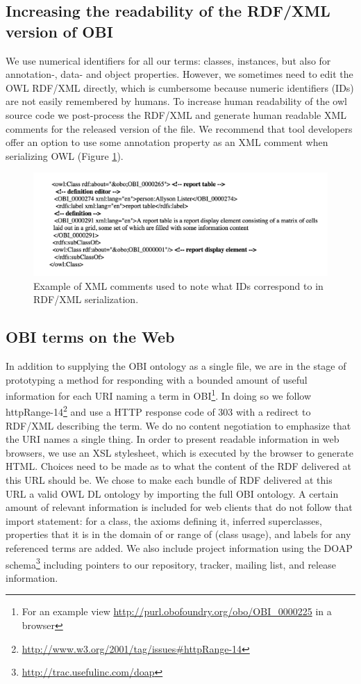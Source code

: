 \documentclass{elsart}       %
\begin{document}
\subsection{Increasing the readability of the RDF/XML version of OBI}

We use numerical identifiers for all our terms: classes, instances, but also for annotation-, data- and object properties.
However, we sometimes need to edit the OWL RDF/XML directly, which is cumbersome because numeric identifiers (IDs) are not easily remembered by humans.
To increase human readability of the owl source code we post-process the RDF/XML and generate human readable XML comments for the released version of the file.
We recommend that tool developers offer an option to use some annotation property as an XML comment when serializing OWL (Figure \ref{fig:comments}).  

\begin{figure}[t]
\centering \includegraphics*[width=1\columnwidth]{xmlcomments}
\caption{Example of XML comments used to note what IDs correspond to in RDF/XML serialization.}
\label{fig:comments}
\end{figure}

\subsection{OBI terms on the Web}

In addition to supplying the OBI ontology as a single file, we are in the stage of prototyping a method for responding with a bounded amount of useful information for each URI naming a term in OBI\footnote{For an example view \url{http://purl.obofoundry.org/obo/OBI_0000225} in a browser}.
In doing so we follow httpRange-14\footnote{\url{http://www.w3.org/2001/tag/issues#httpRange-14}} and use a HTTP response code of 303 with a redirect to RDF/XML describing the term.
We do no content negotiation to emphasize that the URI names a single thing.
In order to present readable information in web browsers, we use an XSL stylesheet, which is executed by the browser to generate HTML.
Choices need to be made as to what the content of the RDF delivered at this URL should be.
We chose to make each bundle of RDF delivered at this URL a valid OWL DL ontology by importing the full OBI ontology.
A certain amount of relevant information is included for web clients that do not follow that import statement: for a class, the axioms defining it, inferred superclasses, properties that it is in the domain of or range of (class usage), and labels for any referenced terms are added.
We also include project information using the DOAP schema\footnote{\url{http://trac.usefulinc.com/doap}} including pointers to our repository, tracker, mailing list, and release information. 
\end{document}
